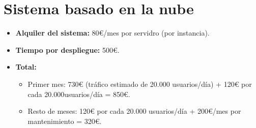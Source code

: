 \section{Sistema basado en la nube}
\begin{itemize}
	\item \textbf{Alquiler del sistema:} 80\euro/mes por servidro (por instancia).
	\item \textbf{Tiempo por despliegue:} 500\euro.
	\item \textbf{Total:}
	\begin{itemize}
	\item Primer mes: 730\euro \hspace{1pt} (tráfico estimado de 20.000 usuarios/día) + 120\euro \hspace{1pt} por cada 20.000usuarios/día = 850\euro.
	\item Resto de meses: 120\euro \hspace{1pt} por cada 20.000 usuarios/día + 200\euro/mes por mantenimiento = 320\euro.
\end{itemize}

\end{itemize}



